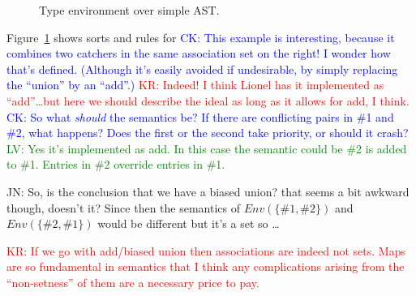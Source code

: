 \documentclass[letterpaper,11pt]{article}
\newcommand{\CK}[1]{\textcolor{blue}{CK: #1}}
\newcommand{\KR}[1]{\textcolor{red}{KR: #1}}
\newcommand{\LV}[1]{\textcolor{green}{LV: #1}}
\newcommand{\JN}[1]{\textcolor{orange!70!black}{JN: #1}}
\begin{document}
\begin{figure}[h!t]
  \caption{Type environment over simple AST.}
  \label{fig:te}
\end{figure}

\begin{example}\label{ex:te}
  Figure~\ref{fig:te} shows sorts and rules for 
\CK{This example is interesting, because it combines two catchers in
the same association set on the right! I wonder how that's defined.
(Although it's easily avoided if undesirable, by simply replacing the
``union'' by an ``add''.)}
\KR{Indeed! I think Lionel has it implemented as ``add''…but here we should describe the ideal as
 long as it allows for add, I think.}
\CK{So what \emph{should} the semantics be?  If there are conflicting
 pairs in \#1 and \#2, what happens? Does the first or the second take
 priority, or should it crash?}
\LV{Yes it's implemented as add. In this case the semantic could
be \#2 is added to \#1. Entries in \#2 override entries in \#1.}

\JN{So, is the conclusion that we have a biased union? that seems a bit awkward though, doesn't it?
  Since then the semantics of $Env(\{\#1,\#2\})$ and $Env(\{\#2,\#1\})$ would be different but it's
  a set so \dots}

\KR{If we go with add/biased union then associations are indeed not sets. Maps are so fundamental in
  semantics that I think any complications arising from the ``non-setness'' of them are a necessary
  price to pay.}

\end{example}
\end{document}
